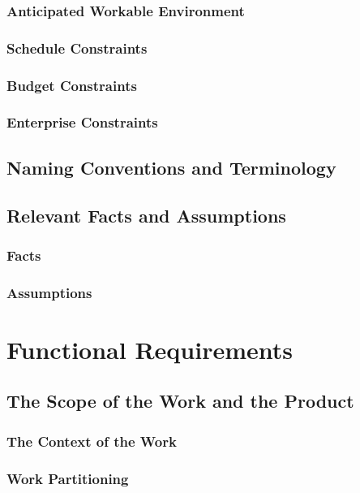 \documentclass{article}
\begin{document}
\subsubsection{Anticipated Workable Environment}
\subsubsection{Schedule Constraints}
\subsubsection{Budget Constraints}
\subsubsection{Enterprise Constraints}
\subsection{Naming Conventions and Terminology}
\subsection{Relevant Facts and Assumptions}
\subsubsection{Facts}
\subsubsection{Assumptions}



\section{Functional Requirements}

\subsection{The Scope of the Work and the Product}

\subsubsection{The Context of the Work}

\subsubsection{Work Partitioning}
\end{document}
